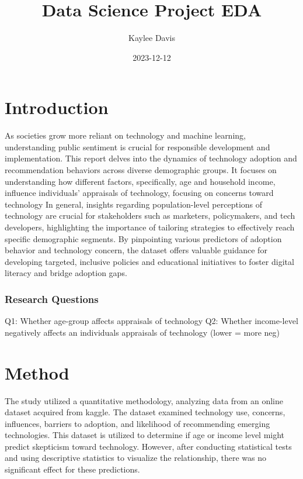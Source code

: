 \documentclass[
]{article}
\title{Data Science Project EDA}
\author{Kaylee Davis}
\date{2023-12-12}
\begin{document}
\maketitle

\hypertarget{introduction}{%
\section{Introduction}\label{introduction}}

As societies grow more reliant on technology and machine learning,
understanding public sentiment is crucial for responsible development
and implementation. This report delves into the dynamics of technology
adoption and recommendation behaviors across diverse demographic groups.
It focuses on understanding how different factors, specifically, age and
household income, influence individuals' appraisals of technology,
focusing on concerns toward technology In general, insights regarding
population-level perceptions of technology are crucial for stakeholders
such as marketers, policymakers, and tech developers, highlighting the
importance of tailoring strategies to effectively reach specific
demographic segments. By pinpointing various predictors of adoption
behavior and technology concern, the dataset offers valuable guidance
for developing targeted, inclusive policies and educational initiatives
to foster digital literacy and bridge adoption gaps.

\hypertarget{research-questions}{%
\subsubsection{Research Questions}\label{research-questions}}

Q1: Whether age-group affects appraisals of technology Q2: Whether
income-level negatively affects an individuals appraisals of technology
(lower = more neg)

\hypertarget{method}{%
\section{Method}\label{method}}

The study utilized a quantitative methodology, analyzing data from an
online dataset acquired from kaggle. The dataset examined technology
use, concerns, influences, barriers to adoption, and likelihood of
recommending emerging technologies. This dataset is utilized to
determine if age or income level might predict skepticism toward
technology. However, after conducting statistical tests and using
descriptive statistics to visualize the relationship, there was no
significant effect for these predictions.
\end{document}
